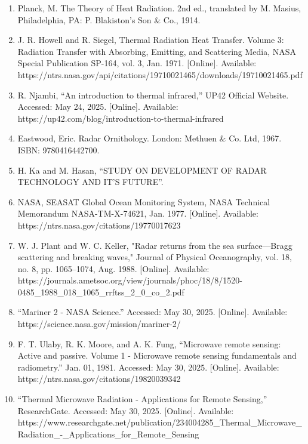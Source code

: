 \documentclass{article}
\begin{document}
\begin{enumerate}
    \item{Planck, M. The Theory of Heat Radiation. 2nd ed., translated by M. Masius, Philadelphia, PA: P. Blakiston's Son & Co., 1914.}

    \item{J. R. Howell and R. Siegel, Thermal Radiation Heat Transfer. Volume 3: Radiation Transfer with Absorbing, Emitting, and Scattering Media, NASA Special Publication SP-164, vol. 3, Jan. 1971. [Online]. Available: https://ntrs.nasa.gov/api/citations/19710021465/downloads/19710021465.pdf}

    \item {R. Njambi, “An introduction to thermal infrared,” UP42 Official Website. Accessed: May 24, 2025. [Online]. Available: https://up42.com/blog/introduction-to-thermal-infrared}

    \item{Eastwood, Eric. Radar Ornithology. London: Methuen & Co. Ltd, 1967. ISBN: 9780416442700.}

    \item{H. Ka and M. Hasan, “STUDY ON DEVELOPMENT OF RADAR TECHNOLOGY AND IT’S FUTURE”.}

    \item{NASA, SEASAT Global Ocean Monitoring System, NASA Technical Memorandum NASA-TM-X-74621, Jan. 1977. [Online]. Available: https://ntrs.nasa.gov/citations/19770017623}


    \item {W. J. Plant and W. C. Keller, "Radar returns from the sea surface—Bragg scattering and breaking waves," Journal of Physical Oceanography, vol. 18, no. 8, pp. 1065–1074, Aug. 1988. [Online]. Available: https://journals.ametsoc.org/view/journals/phoc/18/8/1520-0485_1988_018_1065_rrftss_2_0_co_2.pdf}

    \item{“Mariner 2 - NASA Science.” Accessed: May 30, 2025. [Online]. Available: https://science.nasa.gov/mission/mariner-2/}


    \item{F. T. Ulaby, R. K. Moore, and A. K. Fung, “Microwave remote sensing: Active and passive. Volume 1 - Microwave remote sensing fundamentals and radiometry.” Jan. 01, 1981. Accessed: May 30, 2025. [Online]. Available: https://ntrs.nasa.gov/citations/19820039342}


    \item{“Thermal Microwave Radiation - Applications for Remote Sensing,” ResearchGate. Accessed: May 30, 2025. [Online]. Available: https://www.researchgate.net/publication/234004285_Thermal_Microwave_Radiation_-_Applications_for_Remote_Sensing}



\end{enumerate}
\end{document}
